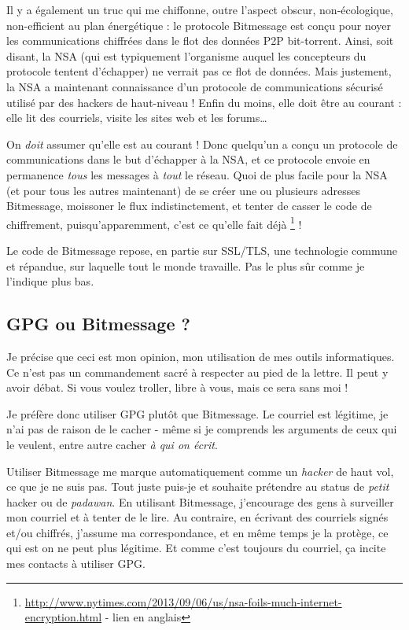 Il y a également un truc qui me chiffonne, outre l'aspect obscur, non-écologique, non-efficient au plan énergétique : le protocole
Bitmessage est conçu pour noyer les communications chiffrées dans le flot des données P2P bit-torrent. Ainsi, soit disant, la NSA (qui est
typiquement l'organisme auquel les concepteurs du protocole tentent d'échapper) ne verrait pas ce flot de données. Mais justement, la NSA a maintenant connaissance d'un protocole de communications sécurisé utilisé par des hackers de haut-niveau ! Enfin
du moins, elle doit être au courant : elle lit des courriels, visite les sites web et les forums\ldots{}

On \emph{doit} assumer qu'elle est au courant ! Donc quelqu'un a conçu
un protocole de communications dans le but d'échapper à la NSA, et ce
protocole envoie en permanence \emph{tous} les messages à \emph{tout} le
réseau. Quoi de plus facile pour la NSA (et pour tous les autres maintenant) de
se créer une ou plusieurs adresses Bitmessage, moissoner le flux indistinctement, et tenter de casser le code de chiffrement,
puisqu'apparemment, c'est ce qu'elle fait déjà \footnote{\url{http://www.nytimes.com/2013/09/06/us/nsa-foils-much-internet-encryption.html} - lien en anglais} !

Le code de Bitmessage repose, en partie sur SSL/TLS, une technologie commune et répandue, sur laquelle tout le monde travaille. Pas le plus
sûr comme je l'indique plus bas.

\subsection{GPG ou Bitmessage ?}\label{gpg-ou-bitmessage}

\begin{notice}
Je précise que ceci est mon opinion, mon utilisation de mes outils informatiques. Ce n'est pas un commandement sacré à respecter au pied de
la lettre. Il peut y avoir débat. Si vous voulez troller, libre à vous, mais ce sera sans moi !
\end{notice}

Je préfère donc utiliser GPG plutôt que Bitmessage. Le courriel est
légitime, je n'ai pas de raison de le cacher - même si je comprends les
arguments de ceux qui le veulent, entre autre cacher \emph{à qui on écrit}.

Utiliser Bitmessage me marque automatiquement comme un \emph{hacker} de haut vol, ce que je ne suis pas. Tout juste puis-je et souhaite
prétendre au status de \emph{petit} hacker ou de \emph{padawan}. En utilisant Bitmessage, j'encourage des gens à surveiller mon courriel
et à tenter de le lire. Au contraire, en écrivant des courriels signés et/ou chiffrés, j'assume
ma correspondance, et en même temps je la protège, ce qui est on ne peut
plus légitime. Et comme c'est toujours du courriel, ça incite mes
contacts à utiliser GPG.

